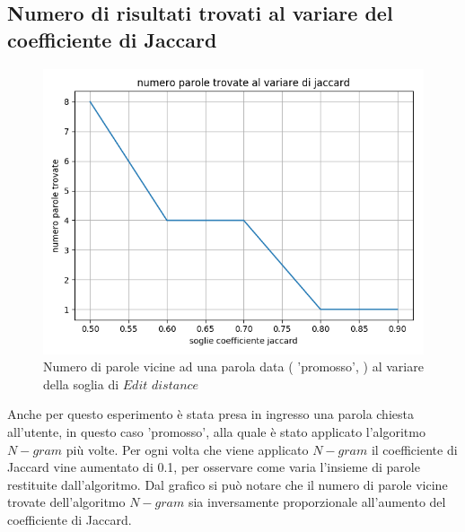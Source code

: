 \documentclass[a4paper,12pt]{article}
\begin{document}
\subsection{Numero di risultati trovati al variare del coefficiente di Jaccard}
\begin{figure}[h]
    \centering
    \captionsetup{justification=centering,margin=1.05cm}
    \includegraphics[width=1.0\textwidth]{Figure_3_1}
    \caption{Numero di parole vicine ad una parola data ( 'promosso', ) al variare della soglia di $Edit$ $distance$}
    \label{fig:test3_2}
\end{figure}
Anche per questo esperimento è stata presa in ingresso una parola chiesta all'utente, in questo caso 'promosso', alla quale è stato applicato l'algoritmo $N-gram$ più volte.
\newline
\newline
Per ogni volta che viene applicato $N-gram$ il coefficiente di Jaccard vine aumentato di 0.1, per osservare come varia l'insieme di parole restituite dall'algoritmo.
\newline
\newline
Dal grafico si può notare che il numero di parole vicine trovate dell'algoritmo $N-gram$ sia inversamente proporzionale all'aumento del coefficiente di Jaccard.
\newline
\newline

\clearpage
\end{document}
